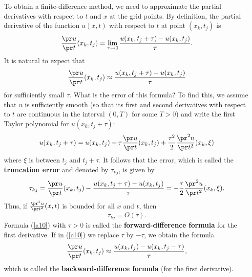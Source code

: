To obtain a finite-difference method, we need to approximate the partial derivatives
with respect to $t$ and $x$ at the grid points. By definition,
the partial derivative of the function $u(x,t)$ with respect to
$t$ at point $(x_k,t_j)$ is
\[
\frac{\pr u}{\pr t}(x_k,t_j)=\lim_{\tau\to 0}\frac{u(x_k,t_j+\tau)-u(x_k,t_j)}{\tau}.
\]
It is natural to expect that
\begin{equation}
\frac{\pr u}{\pr t}(x_k,t_j)\approx \frac{u(x_k,t_j+\tau)-u(x_k,t_j)}{\tau}
\label{a10}
\end{equation}
for sufficiently small $\tau$. What is the error of this formula?
To find this, we assume that $u$ is sufficiently smooth (so that its first and second
derivatives with respect to $t$ are continuous in the interval $(0,T)$ for some $T>0$)
and write the first Taylor polynomial for $u(x_k,t_j+\tau)$:
\[
u(x_k,t_j+\tau)=u(x_k,t_j)+\tau \frac{\pr u}{\pr t}(x_k,t_j)+
\frac{\tau^2}{2}\frac{\pr^2 u}{\pr t^2}(x_k,\xi)
\]
where $\xi$ is between $t_j$ and $t_j+\tau$. It follows that the error,
which is called the {\bf truncation error } and denoted by $\tau_{kj}$,
is given by
\[
\tau_{kj}=\frac{\pr u}{\pr t}(x_k,t_j)-\frac{u(x_k,t_j+\tau)-u(x_k,t_j)}{\tau}=
-\frac{\tau}{2}\frac{\pr^2 u}{\pr t^2}(x_k,\xi).
\]
Thus, if $\frac{\pr^2 u}{\pr t^2}(x,t)$ is bounded for all $x$ and $t$, then
\[
\tau_{kj}=O(\tau).
\]
Formula (\ref{a10}) with $\tau>0$ is called the {\bf forward-difference formula}
for the first derivative.
If in (\ref{a10}) we replace $\tau$ by $-\tau$, we obtain the formula
\begin{equation}
\frac{\pr u}{\pr t}(x_k,t_j)\approx \frac{u(x_k,t_j)-u(x_k,t_j-\tau)}{\tau},
\label{a11}
\end{equation}
which is called the {\bf backward-difference formula} (for the first derivative).
 

